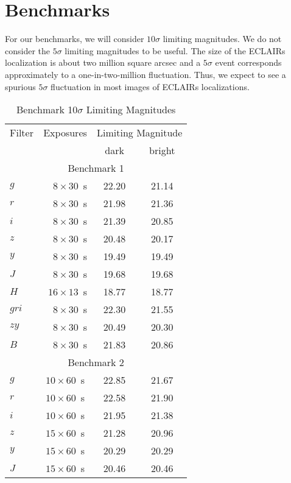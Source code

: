\documentclass{article}
\begin{document}
\section{Benchmarks}

For our benchmarks, we will consider $10\sigma$ limiting magnitudes. We do not consider the $5\sigma$ limiting magnitudes to be useful. The size of the ECLAIRs localization is about two million square arcsec and a $5\sigma$ event corresponds approximately to a one-in-two-million fluctuation. Thus, we expect to see a spurious $5\sigma$ fluctuation in most images of ECLAIRs localizations.

\begin{table}
\caption{Benchmark 10$\sigma$ Limiting Magnitudes}
\label{table:limiting-magnitude}
\medskip
\begin{center}
\begin{tabular}{lccc}
\hline
\hline
Filter&Exposures&\multicolumn{2}{c}{Limiting Magnitude}\\
&&dark&bright\\
\hline
\multicolumn{4}{c}{Benchmark 1}\\
\hline
$g$  &$\phantom{00}8 \times 30$~s&22.20&21.14\\
$r$  &$\phantom{00}8 \times 30$~s&21.98&21.36\\
$i$  &$\phantom{00}8 \times 30$~s&21.39&20.85\\
$z$  &$\phantom{00}8 \times 30$~s&20.48&20.17\\
$y$  &$\phantom{00}8 \times 30$~s&19.49&19.49\\
$J$  &$\phantom{00}8 \times 30$~s&19.68&19.68\\
$H$  &$\phantom{0}16 \times 13$~s&18.77&18.77\\
$gri$&$\phantom{00}8 \times 30$~s&22.30&21.55\\
$zy$ &$\phantom{00}8 \times 30$~s&20.49&20.30\\
$B$  &$\phantom{00}8 \times 30$~s&21.83&20.86\\
\hline
\multicolumn{4}{c}{Benchmark 2}\\
\hline
$g$  &$\phantom{}10 \times 60$~s&22.85&21.67\\
$r$  &$\phantom{}10 \times 60$~s&22.58&21.90\\
$i$  &$\phantom{}10 \times 60$~s&21.95&21.38\\
$z$  &$\phantom{}15 \times 60$~s&21.28&20.96\\
$y$  &$\phantom{}15 \times 60$~s&20.29&20.29\\
$J$  &$\phantom{}15 \times 60$~s&20.46&20.46\\

\end{tabular}
\end{center}
\end{table}
\end{document}
